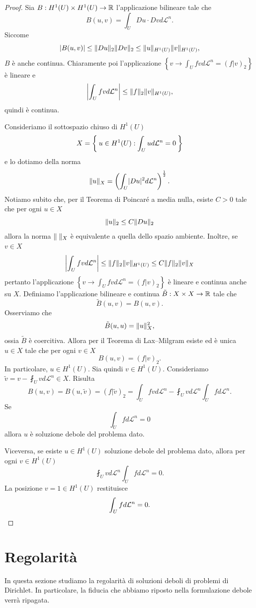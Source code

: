\begin{proof}
	Sia $B: H^1(U) \times H^1(U) \to \R$ l'applicazione bilineare tale che
	\[ B(u,v) = \int_U Du \cdot Dv d\mathcal{L}^n. \]
	Siccome
	\[ \abs{B(u,v)} \le \norm{Du}_2\norm{Dv}_2 \le \norm{u}_{H^1(U)} \norm{v}_{H^1(U)},\]  
	$B$ è anche continua. Chiaramente poi l'applicazione $\left\lbrace v \to \int_U fvd\mathcal{L}^n = (f|v)_2\right\rbrace $ è lineare e 
	\[ \abs*{\int_U fvd\mathcal{L}^n} \le \norm{f}_2\norm{v}_{H^1(U)}, \]
	quindi è continua.
	
	Consideriamo il sottospazio chiuso di $H^1(U)$
	\[ X = \Set{ u \in H^1(U): \int_U u d\mathcal{L}^n = 0} \]
	e lo dotiamo della norma
	\[ \norm{u}_X = \left( \int_U \abs{Du}^2d\mathcal{L}^n\right) ^{\frac{1}{2}}. \]
	Notiamo subito che, per il Teorema di Poincaré a media nulla, esiste $C>0$ tale che per ogni $u \in X$
	\[ \norm{u}_2 \le C\norm{Du}_2 \]
	allora la norma $\norm{\;}_X$ è equivalente a quella dello spazio ambiente. Inoltre, se $v \in X$
	\[ \abs*{\int_U fvd\mathcal{L}^n} \le \norm{f}_2\norm{v}_{H^1(U)} \le C\norm{f}_2\norm{v}_{X}\]
	pertanto l'applicazione $\left\lbrace v \to \int_U fvd\mathcal{L}^n = (f|v)_2\right\rbrace $ è lineare e continua anche su $X$. Definiamo l'applicazione bilineare e continua $\tilde{B}: X\times X \to \R$ tale che
	\[ \tilde{B}(u,v) = B(u,v). \] 
	Osserviamo che
	\[ \tilde{B}(u,u) = \norm{u}_X^2, \]
	ossia $\tilde{B}$ è coercitiva. Allora per il Teorema di Lax--Milgram esiste ed è unica $u \in X$ tale che per ogni $v \in X$
	\[ B(u,v) = (f|v)_2. \]
	In particolare, $u \in H^1(U)$. Sia quindi $v \in H^1(U)$. Consideriamo $\tilde{v}= v- \fint_Uvd\mathcal{L}^n \in X$. Risulta
	\[ B(u,v) = B(u,\tilde{v}) = (f|\tilde{v})_2 = \int_U fv d\mathcal{L}^n - \fint_U v d\mathcal{L}^n \int_U f d\mathcal{L}^n.   \]
	Se 
	\[ \int_U f d\mathcal{L}^n = 0 \]
	allora $u$ è soluzione debole del problema dato.
	
	Viceversa, se esiste $u \in H^1(U)$ soluzione debole del problema dato, allora per ogni $v \in H^1(U)$
	\[ \fint_U v d\mathcal{L}^n \int_U f d\mathcal{L}^n = 0. \]
	La posizione $v = 1 \in H^1(U)$ restituisce
	\[ \int_U f d\mathcal{L}^n = 0. \qedhere \]
\end{proof}
\section{Regolarità}
In questa sezione studiamo la regolarità di soluzioni deboli di problemi di Dirichlet. In particolare, la fiducia che abbiamo riposto nella formulazione debole verrà ripagata.

